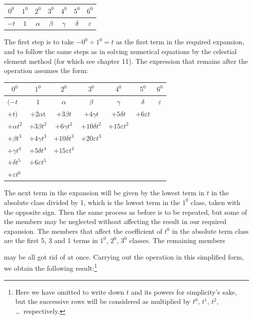 \documentclass[11pt]{article}
\newcommand{\scanpage}[2]{\clearpage\setcounter{footnote}{0}\noindent{\footnotesize\color{gray}PDF page #1 · #2}\par\medskip}
\begin{document}
\begin{center}
\begin{tabular}{|c|c|c|c|c|c|c|}
\hline
$0^0$ & $1^0$ & $2^0$ & $3^0$ & $4^0$ & $5^0$ & $6^0$ \\
\hline
$-t$ & $1$ & $\alpha$ & $\beta$ & $\gamma$ & $\delta$ & $\varepsilon$ \\
\hline
\end{tabular}
\end{center}

The first step is to take $-0^0\div 1^0=t$ as the first term in the required expansion, and to follow the same steps as in solving numerical equations by the celestial element method (for which see chapter 11). The expression that remains after the operation assumes the form:

\begin{center}
\begin{tabular}{|l|c|c|c|c|c|c|}
\hline
\multicolumn{1}{|c|}{$0^0$} & $1^0$ & $2^0$ & $3^0$ & $4^0$ & $5^0$ & $6^0$ \\
\hline
$(-t$ & $1$ & $\alpha$ & $\beta$ & $\gamma$ & $\delta$ & $\varepsilon$ \\
\quad$+t)$ & $+2\alpha\mathrm{t}$ & $+3\beta t$ & $+4\gamma t$ & $+5\delta t$ & $+6\varepsilon t$ & \\
$+\alpha t^2$ & $+3\beta t^2$ & $+6\gamma t^2$ & $+10\delta t^2$ & $+15\varepsilon t^2$ & & \\
$+\beta t^3$ & $+4\gamma t^3$ & $+10\delta t^3$ & $+20\varepsilon t^3$ & & & \\
$+\gamma t^4$ & $+5\delta t^4$ & $+15\varepsilon t^4$ & & & & \\
$+\delta t^5$ & $+6\varepsilon t^5$ & & & & & \\
$+\varepsilon t^6$ & & & & & & \\
\hline
\end{tabular}
\end{center}

The next term in the expansion will be given by the lowest term in $t$ in the absolute class divided by 1, which is the lowest term in the $1^0$ class, taken with the opposite sign. Then the same process as before is to be repeated, but some of the members may be neglected without affecting the result in our required expansion. The members that affect the coefficient of $t^6$ in the absolute term class are the first 5, 3 and 1 terms in $1^0$, $2^0$, $3^0$ classes. The remaining members

\scanpage{0296}{printed page 282}
\noindent may be all got rid of at once. Carrying out the operation in this simplified form, we obtain the following result:\footnote{Here we have omitted to write down $t$ and its powers for simplicity's sake, but the successive rows will be considered as multiplied by $t^0$, $t^1$, $t^2$, \dots\ respectively.}
\end{document}

